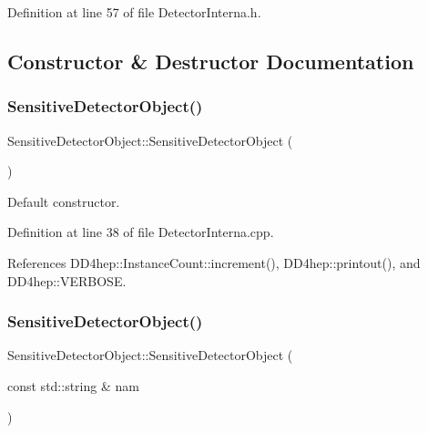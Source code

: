 Definition at line 57 of file Detector\+Interna.\+h.



\subsection{Constructor \& Destructor Documentation}
\hypertarget{class_d_d4hep_1_1_geometry_1_1_sensitive_detector_object_ada6df51a316e3a54c71889a0a7fbd8fd}{}\label{class_d_d4hep_1_1_geometry_1_1_sensitive_detector_object_ada6df51a316e3a54c71889a0a7fbd8fd} 
\subsubsection{\texorpdfstring{Sensitive\+Detector\+Object()}{SensitiveDetectorObject()}\hspace{0.1cm}{\footnotesize\ttfamily [1/2]}}
{\footnotesize\ttfamily Sensitive\+Detector\+Object\+::\+Sensitive\+Detector\+Object (\begin{DoxyParamCaption}{ }\end{DoxyParamCaption})}



Default constructor. 



Definition at line 38 of file Detector\+Interna.\+cpp.



References D\+D4hep\+::\+Instance\+Count\+::increment(), D\+D4hep\+::printout(), and D\+D4hep\+::\+V\+E\+R\+B\+O\+SE.

\hypertarget{class_d_d4hep_1_1_geometry_1_1_sensitive_detector_object_a663926f8216403d414c27ed7c57cc2c3}{}\label{class_d_d4hep_1_1_geometry_1_1_sensitive_detector_object_a663926f8216403d414c27ed7c57cc2c3} 
\subsubsection{\texorpdfstring{Sensitive\+Detector\+Object()}{SensitiveDetectorObject()}\hspace{0.1cm}{\footnotesize\ttfamily [2/2]}}
{\footnotesize\ttfamily Sensitive\+Detector\+Object\+::\+Sensitive\+Detector\+Object (\begin{DoxyParamCaption}\item[{const std\+::string \&}]{nam }\end{DoxyParamCaption})}



